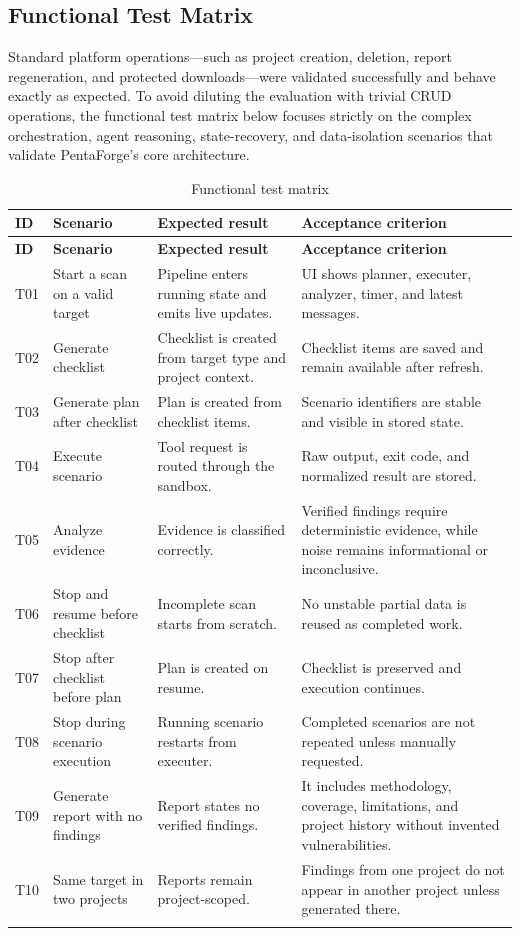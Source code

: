 \documentclass[12pt,a4paper]{report}
\begin{document}
\subsection{Functional Test Matrix}

Standard platform operations---such as project creation, deletion, report regeneration, and protected downloads---were validated successfully and behave exactly as expected. To avoid diluting the evaluation with trivial CRUD operations, the functional test matrix below focuses strictly on the complex orchestration, agent reasoning, state-recovery, and data-isolation scenarios that validate PentaForge's core architecture.

\begin{longtable}{|p{}|p{}|p{}|p{}|}
\hline
\textbf{ID} & \textbf{Scenario} & \textbf{Expected result} & \textbf{Acceptance criterion} \\
\hline
\endfirsthead
\hline
\textbf{ID} & \textbf{Scenario} & \textbf{Expected result} & \textbf{Acceptance criterion} \\
\hline
\endhead
T01 & Start a scan on a valid target & Pipeline enters running state and emits live updates. & UI shows planner, executer, analyzer, timer, and latest messages. \\
\hline
T02 & Generate checklist & Checklist is created from target type and project context. & Checklist items are saved and remain available after refresh. \\
\hline
T03 & Generate plan after checklist & Plan is created from checklist items. & Scenario identifiers are stable and visible in stored state. \\
\hline
T04 & Execute scenario & Tool request is routed through the sandbox. & Raw output, exit code, and normalized result are stored. \\
\hline
T05 & Analyze evidence & Evidence is classified correctly. & Verified findings require deterministic evidence, while noise remains informational or inconclusive. \\
\hline
T06 & Stop and resume before checklist & Incomplete scan starts from scratch. & No unstable partial data is reused as completed work. \\
\hline
T07 & Stop after checklist before plan & Plan is created on resume. & Checklist is preserved and execution continues. \\
\hline
T08 & Stop during scenario execution & Running scenario restarts from executer. & Completed scenarios are not repeated unless manually requested. \\
\hline
T09 & Generate report with no findings & Report states no verified findings. & It includes methodology, coverage, limitations, and project history without invented vulnerabilities. \\
\hline
T10 & Same target in two projects & Reports remain project-scoped. & Findings from one project do not appear in another project unless generated there. \\
\hline
\caption{Functional test matrix}
\label{tab:functional_test_matrix}
\end{longtable}
\end{document}
